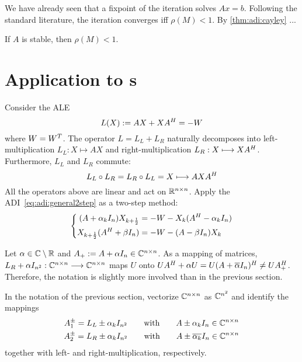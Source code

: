 We have already seen that a fixpoint of the iteration solves $Ax=b$.
Following the standard literature,
the iteration converges iff $\rho(M) < 1$.
By \autoref{thm:adi:cayley} ...

\begin{hypothesis}
\label{thm:adi:convergence}
  If $A$ is stable, then $\rho(M) < 1$.
\end{hypothesis}


\section{Application to s}
\label{sec:adi:ale}

Consider the \ac{ALE}
\begin{equation*}
\label{eq:adi:ale}
  L(X) := AX + XA^H = -W
\end{equation*}
where $W = W^T$.
The \Lyapunov operator $L = L_L + L_R$ naturally decomposes into
left-multiplication $L_L : X \mapsto AX$ and
right-multiplication $L_R : X \longmapsto XA^H$.
Furthermore, $L_L$ and $L_R$ commute:
\begin{equation*}
  L_L \circ L_R = L_R \circ L_L = X \longmapsto AXA^H
\end{equation*}
All the operators above are linear and act on $\mathbb{R}^{n\times n}$.
Apply the \ac{ADI}~\eqref{eq:adi:general2step} as a two-step method:
\begin{equation}
  \left\{
  \begin{aligned}
    (A + \alpha_k I_n) X_{k+\frac{1}{2}} &= -W - X_k (A^H - \alpha_k I_n) \\
    X_{k+\frac{1}{2}} (A^H + \beta I_n) &= -W - (A - \beta I_n) X_k
  \end{aligned}
  \right.
\end{equation}

\begin{remark}
  Let $\alpha\in\mathbb{C}\setminus\mathbb{R}$ and $A_+ := A+\alpha I_n \in\mathbb{C}^{n\times n}$.
  As a mapping of matrices,
  $L_R + \alpha I_{n^2} : \mathbb{C}^{n\times n} \longrightarrow \mathbb{C}^{n\times n}$ maps $U$ onto
  $
    U A^\HT + \alpha U =
    U(A+\conj{\alpha} I_n)^\HT \neq
    U A_+^\HT
  $.
  Therefore, the notation is slightly more involved than in the previous section.

  In the notation of the previous section,
  vectorize $\mathbb{C}^{n\times n}$ as $\mathbb{C}^{n^2}$ and identify the mappings
  \begin{gather*}
    A_1^\pm = L_L \pm \alpha_k I_{n^2}
    \qquad\text{with}\qquad
    A \pm \alpha_k I_n \in\Cnn \\
    A_2^\pm = L_R \pm \alpha_k I_{n^2}
    \qquad\text{with}\qquad
    A \pm \conj{\alpha_k} I_n \in\Cnn
  \end{gather*}
  together with left- and right-multiplication, respectively.
\end{remark}

